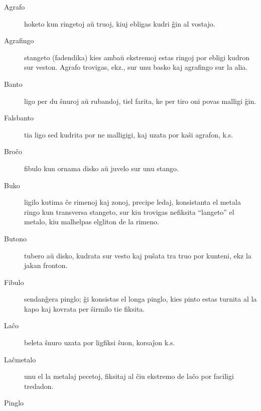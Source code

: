 \begin{description}
\item[Agrafo]

 hoketo kun ringetoj aŭ truoj, kiuj ebligas kudri ĝin al vostajo.

\item[Agrafingo]

 stangeto (fadendika) kies ambaŭ ekstremoj estas ringoj por ebligi kudron sur veston. Agrafo trovigas, ekz., sur unu basko kaj agrafingo sur la alia.

\item[Banto]

 ligo per du ŝnuroj aŭ rubandoj, tiel farita, ke per tiro oni povas malligi ĝin.

\item[Falsbanto]

 tia ligo sed kudrita por ne malligigi, kaj uzata por kaŝi agrafon, k.s.

\item[Broĉo]

 fibulo kun ornama disko aŭ juvelo sur unu stango.

\item[Buko]

 ligilo kutima ĉe rimenoj kaj zonoj, precipe ledaj, konsistanta el metala ringo kun transversa stangeto, sur kiu trovigas nefiksita ``langeto'' el metalo, kiu malhelpas elgliton de la rimeno.

\item[Butono]

 tubero aŭ disko, kudrata sur vesto kaj puŝata tra truo por kunteni, ekz la jakan fronton.

\item[Fibulo]

 sendanĝera pinglo; ĝi konsistas el longa pinglo, kies pinto estas turnita al la kapo kaj kovrata per ŝirmilo tie fiksita.

\item[Laĉo]

 beleta ŝnuro uzata por ligfiksi ŝuon, korsaĵon k.s.

\item[Laĉmetalo]

 unu el la metalaj pecetoj, fiksitaj al ĉiu ekstremo de laĉo por faciligi tredadon.

\item[Pinglo]


\end{description}
